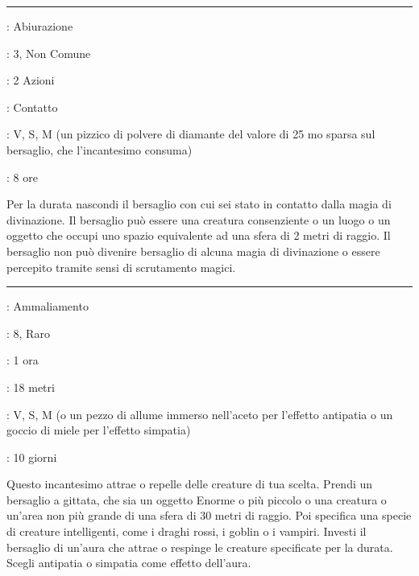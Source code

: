 \begin{multicols}{2}
\smallskip\noindent\rule{\linewidth}{2pt} \hypertarget{Anti-Individuazione}{}\medskip{}
\noindent
\begin{description}[noitemsep, topsep=0pt, parsep=0pt, partopsep=0pt, leftmargin=0cm, labelwidth=2.8cm]
	\item[\textbf{Lista di Magia}]: Abiurazione
	\item[\textbf{Livello}]: 3, Non Comune
	\item[\textbf{T. di Lancio}]: 2 Azioni
	\item[\textbf{Gittata}]: Contatto
	\item[\textbf{Componenti}]: V, S, M (un pizzico di polvere di diamante del valore di 25 mo sparsa sul bersaglio, che l'incantesimo consuma)
	\item[\textbf{Durata}]: 8 ore
\end{description}

Per la durata nascondi il bersaglio con cui sei stato in contatto dalla magia di divinazione. Il bersaglio può essere una creatura consenziente o un luogo o un oggetto che occupi uno spazio equivalente ad una sfera di 2 metri di raggio. Il bersaglio non può divenire bersaglio di alcuna magia di divinazione o essere percepito tramite sensi di scrutamento magici.

\smallskip\noindent\rule{\linewidth}{2pt} \hypertarget{Antipatia/Simpatia}{}\medskip{}
\noindent
\begin{description}[noitemsep, topsep=0pt, parsep=0pt, partopsep=0pt, leftmargin=0cm, labelwidth=2.8cm]
	\item[\textbf{Lista di Magia}]: Ammaliamento
	\item[\textbf{Livello}]: 8, Raro
	\item[\textbf{T. di Lancio}]: 1 ora
	\item[\textbf{Gittata}]: 18 metri
	\item[\textbf{Componenti}]: V, S, M (o un pezzo di allume immerso nell'aceto per l'effetto antipatia o un goccio di miele per l'effetto simpatia)
	\item[\textbf{Durata}]: 10 giorni
\end{description}

Questo incantesimo attrae o repelle delle creature di tua scelta. Prendi un bersaglio a gittata, che sia un oggetto Enorme o più piccolo o una creatura o un'area non più grande di una sfera di 30 metri di raggio. Poi specifica una specie di creature intelligenti, come i draghi rossi, i goblin o i vampiri. Investi il bersaglio di un'aura che attrae o respinge le creature specificate per la durata. Scegli antipatia o simpatia come effetto dell'aura.


\end{multicols}

